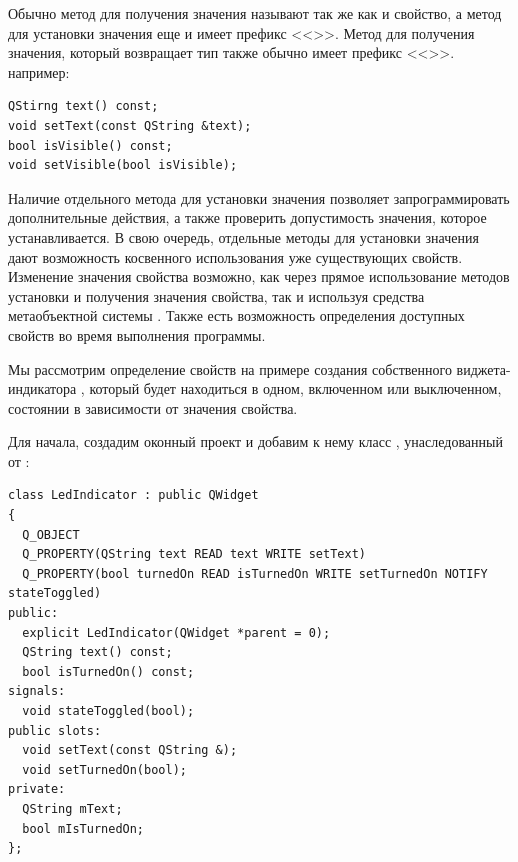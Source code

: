 Обычно метод для получения значения называют так же как и свойство, а метод для установки значения еще и имеет префикс
<<>>. Метод для получения значения, который возвращает тип  также обычно имеет
префикс <<>>. например:
\begin{lstlisting}
QStirng text() const;
void setText(const QString &text);
bool isVisible() const;
void setVisible(bool isVisible);
\end{lstlisting}

Наличие отдельного метода для установки значения позволяет запрограммировать 
дополнительные действия, а также проверить
допустимость значения, которое устанавливается. В свою очередь, отдельные 
методы для установки значения дают
возможность косвенного использования уже существующих свойств. 
Изменение значения свойства возможно, как через прямое
использование методов установки и получения значения свойства, так и используя 
средства метаобъектной системы . Также
есть возможность определения доступных свойств во время выполнения программы.

Мы рассмотрим определение свойств на примере создания собственного 
виджета-индикатора ,
который будет находиться в одном, включенном или выключенном, состоянии 
в зависимости от значения свойства.

Для начала, создадим оконный проект и добавим к нему класс , унаследованный от
:
\begin{lstlisting}
class LedIndicator : public QWidget
{
  Q_OBJECT
  Q_PROPERTY(QString text READ text WRITE setText)
  Q_PROPERTY(bool turnedOn READ isTurnedOn WRITE setTurnedOn NOTIFY stateToggled)
public:
  explicit LedIndicator(QWidget *parent = 0);
  QString text() const;
  bool isTurnedOn() const;
signals:
  void stateToggled(bool);
public slots:
  void setText(const QString &);
  void setTurnedOn(bool);
private:
  QString mText;
  bool mIsTurnedOn;
};
\end{lstlisting}

